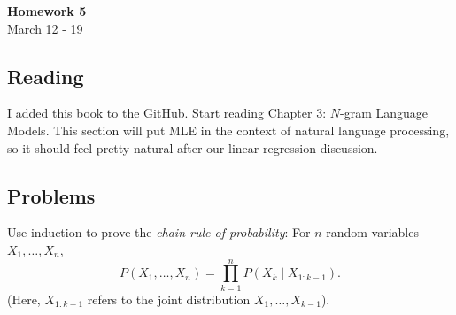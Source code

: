 \documentclass{article}
\newenvironment{envsection}[1]{\begin{trivlist}
\item[\hskip \labelsep {\bfseries #1}]}{\end{trivlist}}
\begin{document}
\setlength{\abovedisplayskip}{4pt}
\setlength{\belowdisplayskip}{4pt}


\begin{center}
    \Large{\textbf{Homework 5}}\\
    \normalsize March 12 - 19
\end{center}
\vspace{10pt}

\subsection*{Reading}

\begin{envsection}{1. Speech and Language Processing:}
    I added this book to the GitHub. Start reading Chapter 3: $N$-gram Language Models. This section will put MLE in the context of natural language processing, so it should feel pretty natural after our linear regression discussion.
\end{envsection}

\subsection*{Problems}

\begin{envsection}{Problem 1.}
    Use induction to prove the \textit{chain rule of probability}: For $n$ random variables $X_1,\dots,X_n$,
    \[
    P(X_1,\dots,X_n) = \prod_{k=1}^{n} P(X_k \mid X_{1:k-1}).
    \]
    (Here, $X_{1:k-1}$ refers to the joint distribution $X_1,\dots,X_{k-1}$).
\end{envsection}
\end{document}
